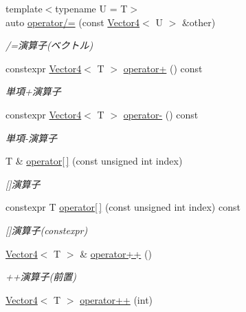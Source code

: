 \begin{DoxyCompactItemize}
{\footnotesize template$<$typename U  = T$>$ }\\auto \mbox{\hyperlink{classsaki_1_1_vector4_a5c4714a49c12318eae4e19ee6280417f}{operator/=}} (const \mbox{\hyperlink{classsaki_1_1_vector4}{Vector4}}$<$ U $>$ \&other)
\begin{DoxyCompactList}\small\item\em /=演算子(ベクトル) \end{DoxyCompactList}\item 
constexpr \mbox{\hyperlink{classsaki_1_1_vector4}{Vector4}}$<$ T $>$ \mbox{\hyperlink{classsaki_1_1_vector4_a566780780cb2a9fabd895273038f7464}{operator+}} () const
\begin{DoxyCompactList}\small\item\em 単項+演算子 \end{DoxyCompactList}\item 
constexpr \mbox{\hyperlink{classsaki_1_1_vector4}{Vector4}}$<$ T $>$ \mbox{\hyperlink{classsaki_1_1_vector4_ad5f77cac422a8ba5881af8b7d3465c67}{operator-\/}} () const
\begin{DoxyCompactList}\small\item\em 単項-\/演算子 \end{DoxyCompactList}\item 
T \& \mbox{\hyperlink{classsaki_1_1_vector4_ac024e2c73933fa64a5e8dccf237bb049}{operator\mbox{[}$\,$\mbox{]}}} (const unsigned int index)
\begin{DoxyCompactList}\small\item\em \mbox{[}\mbox{]}演算子 \end{DoxyCompactList}\item 
constexpr T \mbox{\hyperlink{classsaki_1_1_vector4_a180cd57b2ec16f404857c7f892e02bac}{operator\mbox{[}$\,$\mbox{]}}} (const unsigned int index) const
\begin{DoxyCompactList}\small\item\em \mbox{[}\mbox{]}演算子(constexpr) \end{DoxyCompactList}\item 
\mbox{\hyperlink{classsaki_1_1_vector4}{Vector4}}$<$ T $>$ \& \mbox{\hyperlink{classsaki_1_1_vector4_a50362014413b4c4ebcb567878a0c60bc}{operator++}} ()
\begin{DoxyCompactList}\small\item\em ++演算子(前置) \end{DoxyCompactList}\item 
\mbox{\hyperlink{classsaki_1_1_vector4}{Vector4}}$<$ T $>$ \mbox{\hyperlink{classsaki_1_1_vector4_a6232a0e038857d54e9e977c82e064491}{operator++}} (int)

\end{DoxyCompactItemize}
